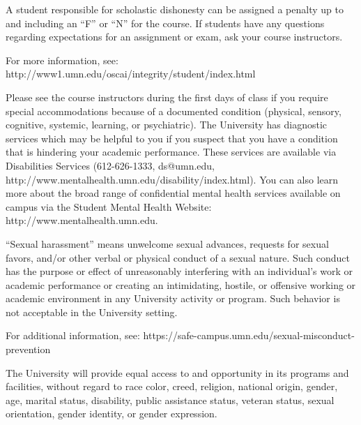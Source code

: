 \documentclass{tufte-handout}
\begin{document}
\begin{fullwidth}
A student responsible for scholastic dishonesty can be assigned a penalty up to and including an “F” or “N” for the course. If students have any questions regarding expectations for an assignment or exam, ask your course instructors.

For more information, see: http://www1.umn.edu/oscai/integrity/student/index.html

 Please see the course instructors during the first days of class if you require special accommodations because of a documented condition (physical, sensory, cognitive, systemic, learning, or psychiatric). The University has diagnostic services which may be helpful to you if you suspect that you have a condition that is hindering your academic performance. These services are available via Disabilities Services (612-626-1333, ds@umn.edu, http://www.mentalhealth.umn.edu/disability/index.html). You can also learn more about the broad range of confidential mental health services available on campus via the Student Mental Health Website: http://www.mentalhealth.umn.edu.

 “Sexual harassment” means unwelcome sexual advances, requests for sexual favors, and/or other verbal or physical conduct of a sexual nature. Such conduct has the purpose or effect of unreasonably interfering with an individual’s work or academic performance or creating an intimidating, hostile, or offensive working or academic environment in any University activity or program. Such behavior is not acceptable in the University setting. 

For additional information, see:
https://safe-campus.umn.edu/sexual-misconduct-prevention

 The University will provide equal access to and opportunity in its programs and facilities, without regard to race color, creed, religion, national origin, gender, age, marital status, disability, public assistance status, veteran status, sexual orientation, gender identity, or gender expression.

\end{fullwidth}
\end{document}
